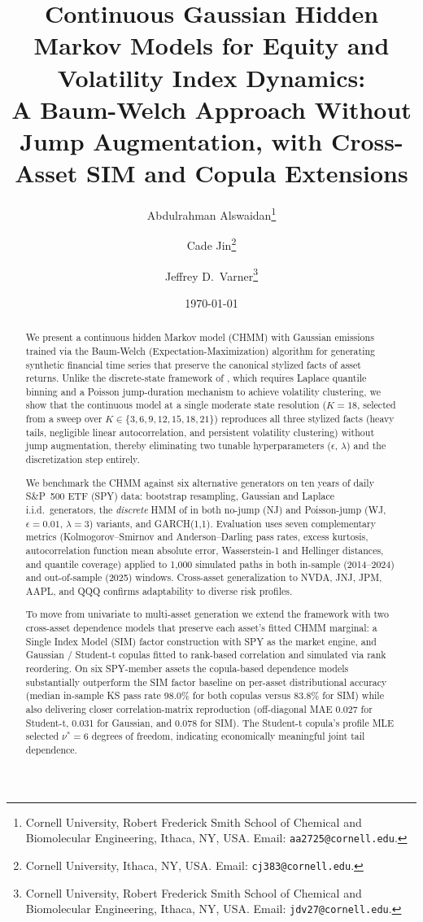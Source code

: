 \documentclass[11pt,a4paper]{article}
\title{Continuous Gaussian Hidden Markov Models for Equity and Volatility Index Dynamics:\\A Baum-Welch Approach Without Jump Augmentation, with Cross-Asset SIM and Copula Extensions}
\author{
    Abdulrahman Alswaidan\thanks{Cornell University, Robert Frederick Smith School of Chemical and Biomolecular Engineering, Ithaca, NY, USA. Email: \texttt{aa2725@cornell.edu}.}
    \and
    Cade Jin\thanks{Cornell University, Ithaca, NY, USA. Email: \texttt{cj383@cornell.edu}.}
    \and
    Jeffrey D.\ Varner\thanks{Cornell University, Robert Frederick Smith School of Chemical and Biomolecular Engineering, Ithaca, NY, USA. Email: \texttt{jdv27@cornell.edu}.}
}
\date{\today}
\begin{document}
\maketitle

\begin{abstract}
We present a continuous hidden Markov model (CHMM) with Gaussian emissions trained via the Baum-Welch (Expectation-Maximization) algorithm for generating synthetic financial time series that preserve the canonical stylized facts of asset returns.
Unlike the discrete-state framework of \citet{alswaidan2026hybrid}, which requires Laplace quantile binning and a Poisson jump-duration mechanism to achieve volatility clustering, we show that the continuous model at a single moderate state resolution ($K = 18$, selected from a sweep over $K \in \{3, 6, 9, 12, 15, 18, 21\}$) reproduces all three stylized facts (heavy tails, negligible linear autocorrelation, and persistent volatility clustering) without jump augmentation, thereby eliminating two tunable hyperparameters ($\epsilon$, $\lambda$) and the discretization step entirely.

We benchmark the CHMM against six alternative generators on ten years of daily S\&P~500 ETF (SPY) data: bootstrap resampling, Gaussian and Laplace i.i.d.\ generators, the \emph{discrete} HMM of \citet{alswaidan2026hybrid} in both no-jump (NJ) and Poisson-jump (WJ, $\epsilon = 0.01$, $\lambda = 3$) variants, and GARCH(1,1).
Evaluation uses seven complementary metrics (Kolmogorov--Smirnov and Anderson--Darling pass rates, excess kurtosis, autocorrelation function mean absolute error, Wasserstein-1 and Hellinger distances, and quantile coverage) applied to 1{,}000 simulated paths in both in-sample (2014--2024) and out-of-sample (2025) windows.
Cross-asset generalization to NVDA, JNJ, JPM, AAPL, and QQQ confirms adaptability to diverse risk profiles.

To move from univariate to multi-asset generation we extend the framework with two cross-asset dependence models that preserve each asset's fitted CHMM marginal: a Single Index Model (SIM) factor construction with SPY as the market engine, and Gaussian / Student-t copulas fitted to rank-based correlation and simulated via rank reordering.
On six SPY-member assets the copula-based dependence models substantially outperform the SIM factor baseline on per-asset distributional accuracy (median in-sample KS pass rate 98.0\% for both copulas versus 83.8\% for SIM) while also delivering closer correlation-matrix reproduction (off-diagonal MAE 0.027 for Student-t, 0.031 for Gaussian, and 0.078 for SIM).
The Student-t copula's profile MLE selected $\nu^{*} = 6$ degrees of freedom, indicating economically meaningful joint tail dependence.


\end{abstract}
\end{document}
